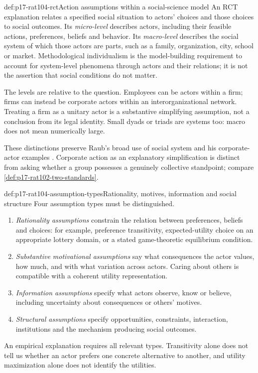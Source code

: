 \begin{hbdefinition}{def:p17-rat104-rct}{Action assumptions within a social-science model}
An RCT explanation relates a specified social situation to actors' choices
and those choices to social outcomes. Its \emph{micro-level} describes actors,
including their feasible actions, preferences, beliefs and behavior. Its
\emph{macro-level} describes the social system of which those actors are
parts, such as a family, organization, city, school or market.
Methodological individualism is the model-building requirement to account
for system-level phenomena through actors and their relations; it is not
the assertion that social conditions do not matter.

The levels are relative to the question. Employees can be actors within a
firm; firms can instead be corporate actors within an interorganizational
network. Treating a firm as a unitary actor is a substantive simplifying
assumption, not a conclusion from its legal identity. Small dyads or triads
are systems too: macro does not mean numerically large.
\end{hbdefinition}

These distinctions preserve Raub's broad use of social system and his
corporate-actor examples
\parencite[pp.~611--612, notes~1--2 on p.~620]{Raub2021RationalChoiceSocialSciences}.
Corporate action as an explanatory simplification is distinct from asking
whether a group possesses a genuinely collective standpoint; compare
\cref{def:p17-rat102-two-standards}.

\begin{hbdefinition}{def:p17-rat104-assumption-types}{Rationality, motives, information and social structure}
Four assumption types must be distinguished.
\begin{enumerate}
\item \emph{Rationality assumptions} constrain the relation between
      preferences, beliefs and choices: for example, preference transitivity,
      expected-utility choice on an appropriate lottery domain, or a stated
      game-theoretic equilibrium condition.
\item \emph{Substantive motivational assumptions} say what consequences the
      actor values, how much, and with what variation across actors. Caring
      about others is compatible with a coherent utility representation.
\item \emph{Information assumptions} specify what actors observe, know or
      believe, including uncertainty about consequences or others' motives.
\item \emph{Structural assumptions} specify opportunities, constraints,
      interaction, institutions and the mechanism producing social outcomes.
\end{enumerate}
An empirical explanation requires all relevant types. Transitivity alone
does not tell us whether an actor prefers one concrete alternative to
another, and utility maximization alone does not identify the utilities.
\end{hbdefinition}


